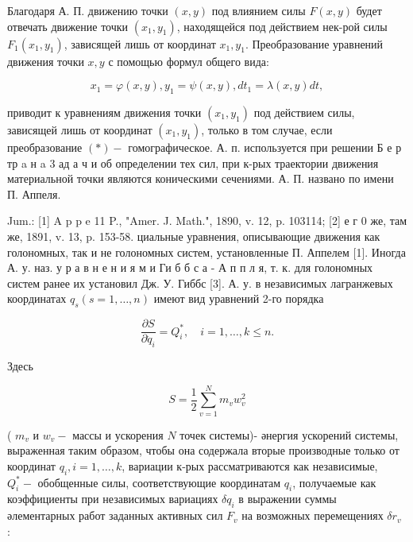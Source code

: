 \documentclass[10pt]{article}
\begin{document}
Благодаря А. П. движению точки $(x, y)$ под влиянием силы $F(x, y)$ будет отвечать движение точки $\left(x_{1}, y_{1}\right)$, находящейся под действием нек-рой силы $F_{1}\left(x_{1}, y_{1}\right)$, зависящей лишь от координат $x_{1}, y_{1}$. Преобразование уравнений движения точки $x, y$ с помощью формул общего вида:



\[

x_{1}=\varphi(x, y), y_{1}=\psi(x, y), d t_{1}=\lambda(x, y) d t,

\]



приводит к уравнениям движения точки $\left(x_{1}, y_{1}\right)$ под действием силы, зависящей лишь от координат $\left(x_{1}, y_{1}\right)$, только в том случае, если преобразование $(*)-$ гомографическое. А. п. используется при решении Б е р тр a н a 3 ад а ч и об определении тех сил, при к-рых траектории движения материальной точки являются коническими сечениями. А. П. названо по имени П. Аппеля.



Jum.: [1] A p p e 11 P., "Amer. J. Math.", 1890, v. 12, p. 103114; [2] е г 0 же, там же, 1891, v. 13, p. 153-58. циальные уравнения, описывающие движения как голономных, так и не голономных систем, установленные П. Аппелем [1]. Иногда А. у. наз. у р а в н е н и я м и Ги б б с а - А п п л я, т. к. для голономных систем ранее их установил Дж. У. Гиббс [3]. А. у. в независимых лагранжевых координатах $q_{s}(s=1, \ldots, n)$ имеют вид уравнений 2-го порядка



\[

\frac{\partial S}{\partial \ddot{q}_{i}}=Q_{i}^{*}, \quad i=1, \ldots, k \leqslant n .

\]



Здесь



\[

S=\frac{1}{2} \sum_{v=1}^{N} m_{v} w_{v}^{2}

\]



( $m_{v}$ и $w_{v}-$ массы и ускорения $N$ точек системы)- әнергия ускорений системы, выраженная таким образом, чтобы она содержала вторые производные только от координат $q_{i}, i=1, \ldots, k$, вариации к-рых рассматриваются как независимые, $Q_{i}^{*}-$ обобщенные силы, соответствующие координатам $q_{i}$, получаемые как коэффициенты при независимых вариациях $\delta q_{i}$ в выражении суммы әлементарных работ заданных активных сил $F_{v}$ на возможных перемещениях $\delta r_{v}$ :
\end{document}
